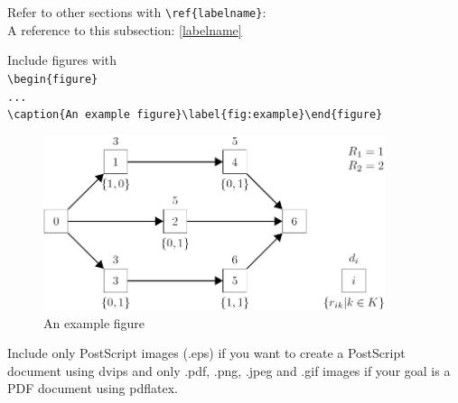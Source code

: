 Refer to other sections with \verb+\ref{labelname}+:\\
A reference to this subsection: \ref{labelname}

Include figures with\\
\verb+\begin{figure}+\\
\verb+...+\\
\verb+\caption{An example figure}\label{fig:example}\end{figure}+

\begin{figure}[h]
\begin{center}
\includegraphics[width=10cm]{images/example_figure}
\caption{An example figure}
\label{fig:example}
\end{center}
\end{figure}

Include only PostScript images (.eps) if you want to create a PostScript document using dvips and only .pdf, .png, .jpeg and .gif images if your goal is a PDF document using pdflatex.